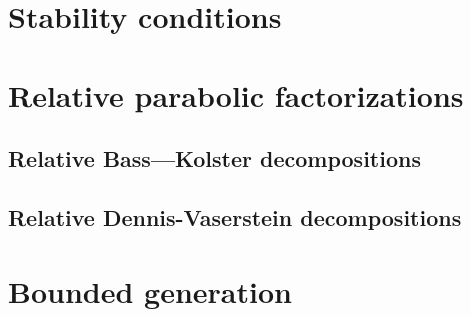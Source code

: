 \documentclass[12pt]{amsart}
\numberwithin{equation}{section}
\theoremstyle{definition}
\begin{document}
\section{Stability conditions}\label{sec:stability-conditions}


\section{Relative parabolic factorizations} \label{sec:factorizations}
\subsection{Relative Bass---Kolster decompositions}\label{sec:bass-kolster}

\subsection{Relative Dennis-Vaserstein decompositions}\label{sec:dennis-vaserstein}


\section{Bounded generation}\label{sec:boundgen}


\printbibliography
\end{document}
